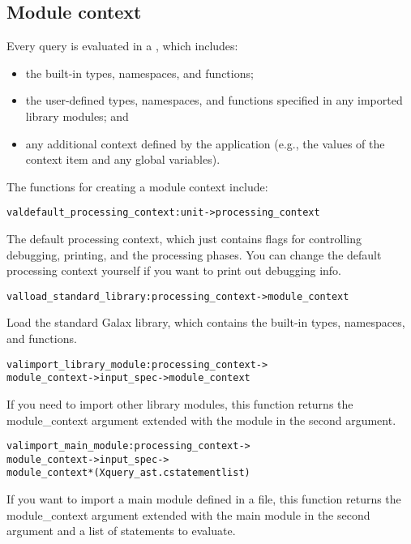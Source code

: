 \subsection{Module context}
Every query is evaluated in a , which includes:
\begin{itemize}
\item the  built-in types, namespaces, and functions; 
\item the user-defined types, namespaces, and functions specified in
     any imported library modules; and
\item any additional context defined by the application (e.g., the values of
     the context item and any global variables).  
\end{itemize}

   The functions for creating a module context include:
\begin{alltt}
   val default\_processing\_context : unit -> processing\_context
\end{alltt}

      The default processing context, which just contains flags for
      controlling debugging, printing, and the processing phases.  You
      can change the default processing context yourself if you want
      to print out debugging info.

\begin{alltt}
   val load\_standard\_library : processing\_context -> module\_context
\end{alltt}
      Load the standard Galax library, which contains the built-in
      types, namespaces, and functions.

\begin{alltt}
val import\_library\_module : processing\_context -> 
  module\_context -> input\_spec -> module\_context
\end{alltt}

      If you need to import other library modules, this function
      returns the module\_context argument extended with the module
      in the second argument.

\begin{alltt}
val import\_main\_module    : processing\_context -> 
  module\_context -> input\_spec -> 
    module\_context * (Xquery\_ast.cstatement list)
\end{alltt}
      If you want to import a main module defined in a file, this
      function returns the module\_context argument extended with the
      main module in the second argument and a list of
      statements to evaluate.

